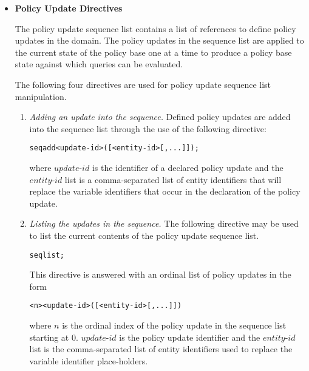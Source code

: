 \documentclass[11pt]{report}
\newenvironment{vverbatim}
{
  \begin{alltt}
}
{
    \vspace{-\baselineskip}
  \end{alltt}
}
\begin{document}
        \begin{itemize}
          \item
            {\bf Policy Update Directives}

            The policy update sequence list contains a list of references to
            define policy updates in the domain. The policy updates in the
            sequence list are applied to the current state of the policy
            base one at a time to produce a policy base state against which
            queries can be evaluated.

            The following four directives are used for policy update
            sequence list manipulation.

            \begin{enumerate}
              \item
                {\em Adding an update into the sequence.}
                Defined policy updates are added into the sequence list
                through the use of the following directive:

                \begin{vverbatim}
  seq add <update-id>([<entity-id>[, ...]]);
                \end{vverbatim}

                \noindent where $update$-$id$ is the identifier of a declared
                policy update and the $entity$-$id$ list is a comma-separated
                list of entity identifiers that will replace the variable
                identifiers that occur in the declaration of the policy
                update.

              \item
                {\em Listing the updates in the sequence.}
                The following directive may be used to list the current
                contents of the policy update sequence list.

                \begin{vverbatim}
  seq list;
                \end{vverbatim}

                This directive is answered with an ordinal list of policy
                updates in the form

                \begin{vverbatim}
  <n> <update-id>([<entity-id>[, ...]])
                \end{vverbatim}

                \noindent where $n$ is the ordinal index of the policy update
                in the sequence list starting at 0. $update$-$id$ is the
                policy update identifier and the $entity$-$id$ list is the
                comma-separated list of entity identifiers used to replace
                the variable identifier place-holders.


\end{enumerate}
\end{itemize}
\end{document}
